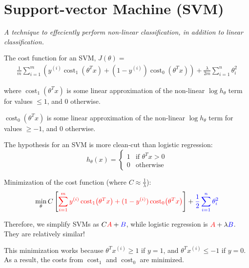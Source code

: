 \section{Support-vector Machine (SVM)}
\emph{A technique to effeciently perform non-linear classification, in addition to linear classification.}

The cost function for an SVM, $J(\theta) = $\\[-0.4em]
\begin{align*}
    \frac{1}{m} \sum_{i=1}^{m} \left(
        y^{(i)} \operatorname{cost}_1 \! \left( \theta^T x \right) +
        (1 - y^{(i)}) \operatorname{cost}_0 \! \left( \theta^T x \right) \right) +
        \frac{\lambda}{2m} \sum_{i=1}^{n} \theta_i^2
\end{align*}

where $\operatorname{cost}_1 \! \left( \theta^Tx \right)$ is some linear approximation
of the non-linear $\log h_\theta$ term for values $\leq 1$, and 0 otherwise.

$\operatorname{cost}_0 \! \left( \theta^Tx \right)$ is some linear approximation
of the non-linear $\log h_\theta$ term for values $\geq -1$, and 0 otherwise.

The hypothesis for an SVM is more clean-cut than logistic regression:\\[-0.2em]
\[ h_\theta(x) = \begin{cases}
    1 & \text{if } \theta^T x > 0 \\
    0 & \text{otherwise}
\end{cases} \]

Minimization of the cost function (where $C \approx \frac{1}{\lambda}$):\\[-0.2em]
\begin{align*}
\min_{\theta} C \left[\textcolor{red}{
    \sum_{i=1}^{m} y^{(i)} \operatorname{cost}_1 \! \left( \theta^T x \right) +
    (1 - y^{(i)}) \operatorname{cost}_0 \! \left( \theta^T x \right)
    }\right]
+ \textcolor{blue}{\frac{1}{2} \sum_{i=1}^{n} \theta_i^2}
\end{align*}

Therefore, we simplify SVMs as $C\textcolor{red}{A} + \textcolor{blue}{B}$,
while logistic regression is $\textcolor{red}{A} + \lambda \textcolor{blue}{B}$.
They are relatively similar!

This minimization works because $\theta^Tx^{(i)} \geq 1$ if $y = 1$,
and $\theta^Tx^{(i)} \leq -1$ if $y = 0$. As a result, the costs from
 $\operatorname{cost}_1$ and $\operatorname{cost}_0$ are minimized.

